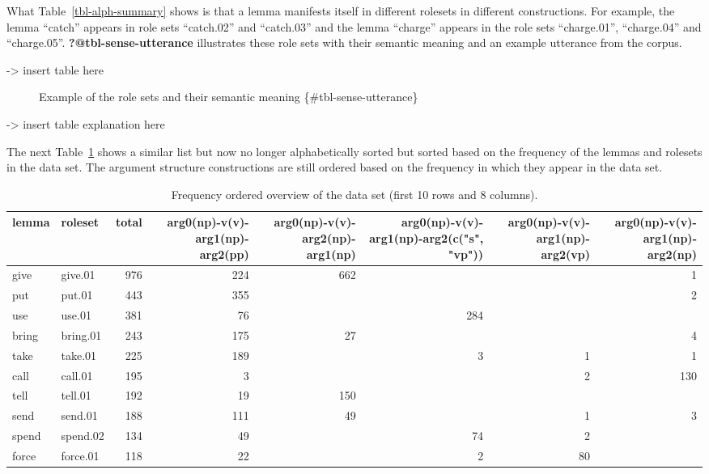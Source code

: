 \documentclass[
  letterpaper,
  DIV=11,
  numbers=noendperiod]{scrartcl}
\begin{document}
What Table~\ref{tbl-alph-summary} shows is that a lemma manifests itself
in different rolesets in different constructions. For example, the lemma
``catch'' appears in role sets ``catch.02'' and ``catch.03'' and the
lemma ``charge'' appears in the role sets ``charge.01'', ``charge.04''
and ``charge.05''. \textbf{?@tbl-sense-utterance} illustrates these role
sets with their semantic meaning and an example utterance from the
corpus.

\begin{description}
\item[-\textgreater{} insert table here]
Example of the role sets and their semantic meaning
\{\#tbl-sense-utterance\}
\end{description}

-\textgreater{} insert table explanation here

The next Table~\ref{tbl-freq-summary} shows a similar list but now no
longer alphabetically sorted but sorted based on the frequency of the
lemmas and rolesets in the data set. The argument structure
constructions are still ordered based on the frequency in which they
appear in the data set.

\hypertarget{tbl-freq-summary}{}
\begin{table}
\caption{\label{tbl-freq-summary}Frequency ordered overview of the data set (first 10 rows and 8
columns). }\tabularnewline

\centering
\begin{tabular}[t]{llrrrrrr}
\toprule
lemma & roleset & total & arg0(np)-v(v)-arg1(np)-arg2(pp) & arg0(np)-v(v)-arg2(np)-arg1(np) & arg0(np)-v(v)-arg1(np)-arg2(c("s", "vp")) & arg0(np)-v(v)-arg1(np)-arg2(vp) & arg0(np)-v(v)-arg1(np)-arg2(np)\\
\midrule
give & give.01 & 976 & 224 & 662 &  &  & 1\\
put & put.01 & 443 & 355 &  &  &  & 2\\
use & use.01 & 381 & 76 &  & 284 &  & \\
bring & bring.01 & 243 & 175 & 27 &  &  & 4\\
take & take.01 & 225 & 189 &  & 3 & 1 & 1\\
\addlinespace
call & call.01 & 195 & 3 &  &  & 2 & 130\\
tell & tell.01 & 192 & 19 & 150 &  &  & \\
send & send.01 & 188 & 111 & 49 &  & 1 & 3\\
spend & spend.02 & 134 & 49 &  & 74 & 2 & \\
force & force.01 & 118 & 22 &  & 2 & 80 & \\
\bottomrule
\end{tabular}
\end{table}
\end{document}
